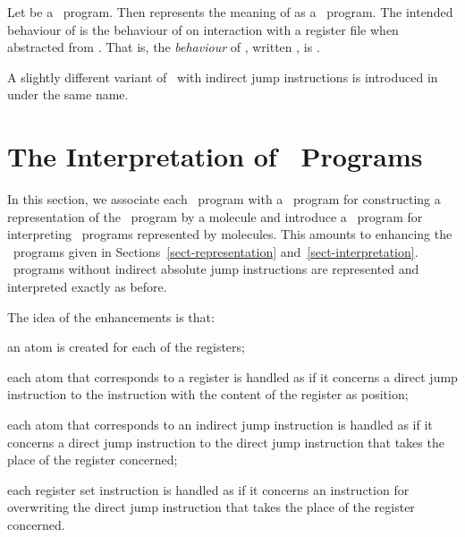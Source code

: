\documentclass[fleqn]{llncs}
\begin{document}
Let  be a \PGLDij\ program.
Then  represents the meaning of  as a \PGLD\ program.
The intended behaviour of  is the behaviour of  on
interaction with a register file when abstracted from .
That is, the \emph{behaviour} of , written , is
.



A slightly different variant of \PGLD\ with indirect jump instructions
is introduced in~\cite{BM07e} under the same name.

\section{The Interpretation of \PGLDij\ Programs}
\label{sect-interpretation-ij}

In this section, we associate each \PGLDij\ program with a \PGA\ program
for constructing a representation of the \PGLDij\ program by a molecule
and introduce a \PGA\ program for interpreting \PGLDij\ programs
represented by molecules.
This amounts to enhancing the \PGA\ programs given in
Sections~\ref{sect-representation} and~\ref{sect-interpretation}.
\PGLDij\ programs without indirect absolute jump instructions are
represented and interpreted exactly as before.

The idea of the enhancements is that:
\begin{iteml}
\item
an atom is created for each of the registers;
\item
each atom that corresponds to a register is handled as if it concerns a
direct jump instruction to the instruction with the content of the
register as position;
\item
each atom that corresponds to an indirect jump instruction is handled as
if it concerns a direct jump instruction to the direct jump instruction
that takes the place of the register concerned;
\item
each register set instruction is handled as if it concerns an
instruction for overwriting the direct jump instruction that takes the
place of the register concerned.
\end{iteml}
\end{document}

